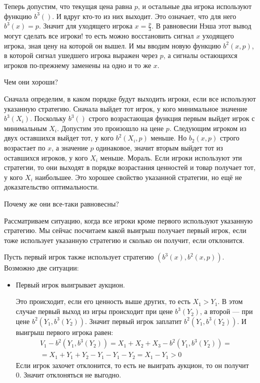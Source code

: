 \begin{myex}
Теперь допустим, что текущая цена равна $ p $, и остальные два игрока используют функцию $ b^{3}() $. И вдруг кто-то из них выходит. Это означает, что для него $ b^{3}(x)=p $. Значит для уходящего игрока $ x=\frac{p}{3} $. В равновесии Нэша этот вывод могут сделать все игроки! то есть можно восстановить сигнал $ x $ уходящего игрока, зная цену на которой он вышел. И мы вводим новую функцию $ b^{2}(x,p) $, в которой сигнал ушедшего игрока выражен через $ p $, а сигналы остающихся игроков по-прежнему заменены на одно и то же $ x $.

Чем они хороши?

Сначала определим, в каком порядке будут выходить игроки, если все используют указанную стратегию. Сначала выйдет тот игрок, у кого минимальное значение $ b^{3}(X_{i}) $. Поскольку $ b^{3}() $ строго возрастающая функция первым выйдет игрок с минимальным $ X_{i} $. Допустим это произошло на цене $ p $. Следующим игроком из двух оставшихся выйдет тот, у кого $ b^{2}(X_{i},p) $ меньше. Но $ b_{2}(x,p) $ строго возрастает по $ x $, а значение $ p $ одинаковое, значит вторым выйдет тот из оставшихся игроков, у кого $ X_{i} $ меньше. Мораль. Если игроки используют эти стратегии, то они выходят в порядке возрастания ценностей и товар получает тот, у кого $ X_{i} $ наибольшее. Это хорошее свойство указанной стратегии, но ещё не доказательство оптимальности.

Почему же они все-таки равновесны?

Рассматриваем ситуацию, когда все игроки кроме первого используют указанную стратегию. Мы сейчас посчитаем какой выигрыш получает первый игрок, если тоже использует указанную стратегию и сколько он получит, если отклонится.

Пусть первый игрок также использует стратегию $ (b^{3}(x), b^{2}(x,p)) $. Возможно две ситуации:
\begin{itemize}
\item Первый игрок выигрывает аукцион.

Это происходит, если его ценность выше других, то есть $ X_{1}>Y_{1} $. В этом случае первый выход из игры происходит при цене $ b^{3}(Y_{2}) $, а второй — при цене $ b^{2}(Y_{1},b^{3}(Y_{2})) $. Значит первый игрок заплатит $ b^{2}(Y_{1},b^{3}(Y_{2})) $. И выигрыш первого игрока равен:
\begin{multline}
V_{1}-b^{2}(Y_{1},b^{3}(Y_{2}))=X_{1}+X_{2}+X_{3}-b^{2}(Y_{1},b^{3}(Y_{2}))=\\
=X_{1}+Y_{1}+Y_{2}-Y_{1}-Y_{1}-Y_{2}=X_{1}-Y_{1}>0
\end{multline}
Если игрок захочет отклонится, то есть не выиграть аукцион, то он получит 0. Значит отклоняться не выгодно.


\end{itemize}
\end{myex}
